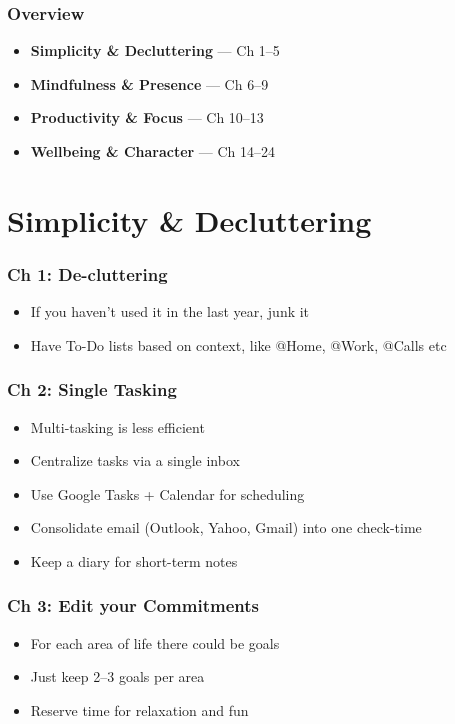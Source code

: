 \begin{frame}[fragile]
\frametitle{Overview}
\begin{itemize}
  \item \textbf{Simplicity \& Decluttering} --- Ch 1--5
  \item \textbf{Mindfulness \& Presence} --- Ch 6--9
  \item \textbf{Productivity \& Focus} --- Ch 10--13
  \item \textbf{Wellbeing \& Character} --- Ch 14--24
\end{itemize}
\end{frame}

\section{Simplicity \& Decluttering}

\begin{frame}[fragile]
\frametitle{Ch 1: De-cluttering}
\begin{itemize}
\item If you haven't used it in the last year, junk it
\item Have To-Do lists based on context, like @Home, @Work, @Calls etc
\end{itemize}
\end{frame}

\begin{frame}[fragile]
\frametitle{Ch 2: Single Tasking}
\begin{itemize}
\item Multi-tasking is less efficient
\item Centralize tasks via a single inbox
\item Use Google Tasks + Calendar for scheduling
\item Consolidate email (Outlook, Yahoo, Gmail) into one check-time
\item Keep a diary for short-term notes
\end{itemize}
\end{frame}

\begin{frame}[fragile]
\frametitle{Ch 3: Edit your Commitments}
\begin{itemize}
\item For each area of life there could be goals
\item Just keep 2--3 goals per area
\item Reserve time for relaxation and fun
\end{itemize}
\end{frame}

